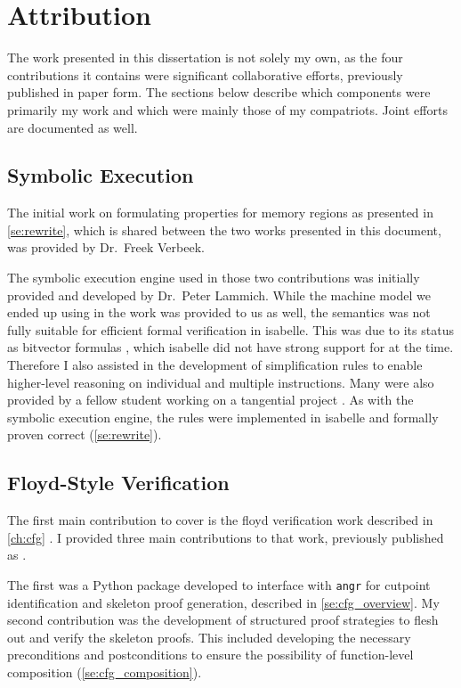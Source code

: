 \chapter{Attribution}\label{attribution}
The work presented in this dissertation is not solely my own,
as the four contributions it contains were significant collaborative efforts, previously published in paper form.
The sections below describe which components were primarily my work
and which were mainly those of my compatriots.
Joint efforts are documented as well.

\section*{Symbolic Execution}
The initial work on formulating properties for memory regions
as presented in \cref{se:rewrite},
which is shared between the two works presented in this document,
was provided by Dr.~Freek Verbeek.

The symbolic execution engine used in those two contributions was initially provided and developed by Dr.~Peter Lammich.
While the machine model we ended up using in the work was provided to us as well,
the semantics was not fully suitable for efficient formal verification in \gls{isabelle}.
This was due to its status as bitvector formulas \autocite{roessle2019verified}, which \gls{isabelle} did not have strong support for at the time.
Therefore I also assisted in the development of simplification rules
to enable higher-level reasoning on individual and multiple instructions.
Many were also provided by a fellow student working on a tangential project \autocite{verbeek2019refinement}.
As with the symbolic execution engine, the rules were implemented in \gls{isabelle} and formally proven correct (\cref{se:rewrite}).

\section*{Floyd-Style Verification}\label{attribute1}
The first main contribution to cover is the \gls{floyd} verification work described in \cref{ch:cfg} \autocite{bockenek2019preservation}.
I provided three main contributions to that work, previously published as .

The first was a Python package developed to interface with \texttt{angr}
\autocite{shoshitaishvili2016state}
for cutpoint identification and skeleton proof generation,
described in \cref{se:cfg_overview}.
My second contribution was the development of structured proof strategies to flesh out and verify the skeleton proofs.
This included developing the necessary preconditions and postconditions to ensure the possibility of function-level composition (\cref{se:cfg_composition}).

